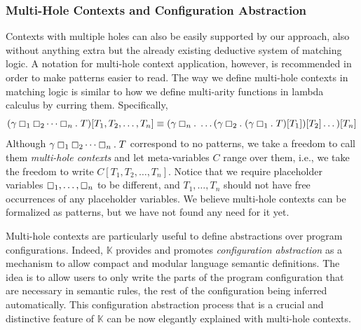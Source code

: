 \documentclass[UTF8,11pt]{article}
\theoremstyle{plain}
\theoremstyle{definition}
\theoremstyle{remark}
\newcommand{\ddd}{,\dots,}
\newcommand{\K}{\mbox{$\mathbb{K}$}\xspace}
\newcommand{\hole}{\boxempty}
\begin{document}
\subsubsection{Multi-Hole Contexts and Configuration Abstraction}
\label{sec:cfg-abstraction}

Contexts with multiple holes can also be easily supported by our approach,
also without anything extra but the already existing deductive system of
matching logic.
A notation for multi-hole context application, however, is recommended in
order to make patterns easier to read. 
The way we define multi-hole contexts in matching logic
is similar to how we define multi-arity functions in lambda calculus
by curring them.
Specifically,
$$
(\gamma \hole_1 \hole_2 \dots \hole_n . \; T)[T_1,T_2,\dots,T_n]
\equiv (\gamma \hole_n .\; \dots (\gamma\hole_2.\;(\gamma\hole_1.\;T)[T_1])[T_2]\dots)[T_n]
$$
Although $\gamma \hole_1 \hole_2 \dots \hole_n . \; T$ correspond to no
patterns, we take a freedom to call them \emph{multi-hole contexts} and
let meta-variables $C$ range over them, i.e., we take the freedom to write
$C[T_1,T_2,\dots,T_n]$.
Notice that we require placeholder variables
$\hole_1 \ddd \hole_n$ to be different,
and $T_1 \ddd T_n$ should not have free occurrences
of any placeholder variables.
We believe multi-hole contexts can be formalized as patterns, but we have
not found any need for it yet.

Multi-hole contexts are particularly useful to define abstractions over
program configurations.
Indeed, \K provides and promotes \emph{configuration abstraction} as a
mechanism to allow compact and modular language semantic definitions.
The idea is to allow users to only write the parts of the program
configuration that are necessary in semantic rules, the rest of the
configuration being inferred automatically.
This configuration abstraction process that is a crucial and distinctive
feature of \K can be now elegantly explained with multi-hole contexts.
\end{document}
